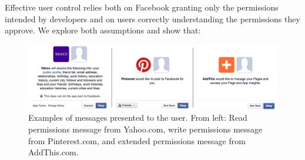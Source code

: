 \documentclass{sig-alternate}
\begin{document}

Effective user control relies both on Facebook granting only the permissions intended by developers and on users correctly understanding the permissions they approve.
We explore both assumptions and show that:

\begin{figure}[htbp]
  \centering
  \includegraphics[width=16.5cm]{message_example}
  \caption{Examples of messages presented to the user. From left: Read permissions message from Yahoo.com, write permissions message from Pinterest.com, and extended permissions message from AddThis.com.}
  \label{figure:messageexample}
\end{figure}
\end{document}
